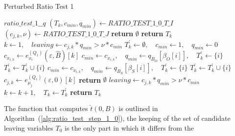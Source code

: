 \documentclass[a4paper]{article}
\begin{document}
\begin{algorithm}
\caption{Perturbed Ratio Test 1}
\label{alg:ratio_test_step_1_pert}
\begin{algorithmic}
\State $ratio\_test\_1\_\_q$
\State $(T_{k}, c_{min}, q_{min}) \gets RATIO\_TEST\_1\_0\_T\_I$
\State $(c_{j,k}, \nu) \gets RATIO\_TEST\_1\_0\_T\_J$
  \State \textbf{return} $\emptyset$
  \State \textbf{return} $T_{k}$
\Else
  \State $k \gets 1, \quad leaving \gets c_{j,k}*q_{min} > \nu * c_{min}$
  \Repeat
    \State $T_{k}^{\prime} \gets \emptyset,
      \quad c_{min} \gets 1,
      \quad q_{min} \gets 0$
      \State $c_{x_{i,k}} \gets e_{x_{i}}^{(Q_{1})}
        (\varepsilon, \hat{B})[k]$
       
	  \State $c_{min} \gets c_{x_{i,k}},
            \quad q_{min} \gets q_{B_{O}}[\beta_{O}[i]],
            \quad T_{k}^{\prime} \gets \{i\}$
	  \State $T_{k}^{\prime} \gets T_{k}^{\prime} \cup \{i\}$
	\EndIf
      \Else {}
	  \State $c_{min} \gets c_{x_{i,k}},
            \quad q_{min} \gets q_{B_{S}}[\beta_{S}[i]],
	    \quad T_{k}^{\prime} \gets \{i\}$
	  \State $T_{k}^{\prime} \gets T_{k}^{\prime} \cup \{i\}$
	\EndIf
      \EndIf
    \EndFor
      \State $c_{j,k} \gets e_{\mu_{j}}^{(Q_{1})}(\varepsilon, 0)[k]$
        \State \textbf{return} $\emptyset$
      \EndIf
      \State $leaving \gets c_{j,k} * q_{min} > \nu *c_{min}$
    \EndIf 
    \State $k \gets k+1, \quad T_{k} \gets T_{k}^{\prime}$
  \State \textbf{return} $T_{k}$
\EndIf    
\EndFunction
\end{algorithmic}
\end{algorithm}
The function that computes $\check{t}(0, B)$ is outlined in
Algorithm~(\ref{alg:ratio_test_step_1_0}), the keeping of the set of candidate
leaving variables $T_{0}$ is the only part in which it differs from the
\end{document}
